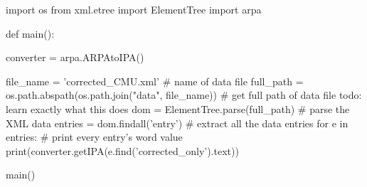 import os
from xml.etree import ElementTree
import arpa



def main():

    converter = arpa.ARPAtoIPA()

    file_name = 'corrected_CMU.xml'     # name of data file
    full_path = os.path.abspath(os.path.join("data", file_name))     # get full path of data file todo: learn exactly what this does
    dom = ElementTree.parse(full_path)      # parse the XML data
    entries = dom.findall('entry')      # extract all the data entries
    for e in entries:       # print every entry's word value
        print(converter.getIPA(e.find('corrected_only').text))

main()